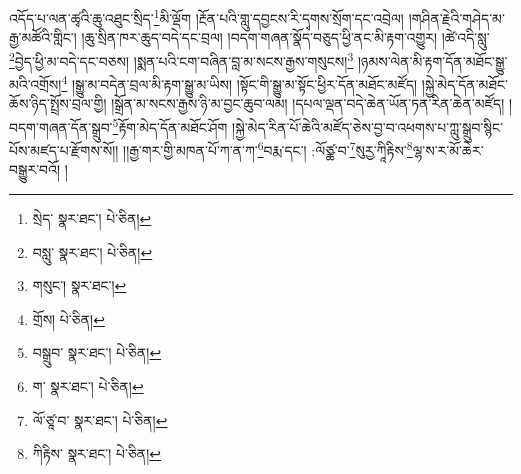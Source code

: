འདོད་པ་ལན་ཚྭའི་ཆུ་འཐུང་སྲིད་\footnote{སྲེད་  སྣར་ཐང་།  པེ་ཅིན། }མི་ལྡོག །རྔོན་པའི་གླུ་དབྱངས་རི་དྭགས་སྲོག་དང་འབྲེལ། །གཤིན་རྗེའི་གཤེད་མ་རྒྱ་མཚོའི་གླིང་། །ཆུ་སྲིན་ཁར་ཆུད་བདེ་དང་བྲལ། །བདག་གཞན་སྣོད་བཅུད་ཕྱི་ནང་མི་རྟག་འགྱུར། །ཚེ་འདི་སླུ་\footnote{བསླུ་  སྣར་ཐང་།  པེ་ཅིན། }བྱེད་ཕྱི་མ་བདེ་དང་བཅས། །སྨན་པའི་ངག་བཞིན་བླ་མ་སངས་རྒྱས་གསུངས།\footnote{གསུང་།  སྣར་ཐང་། } །ཉམས་ལེན་མི་རྟག་དོན་མཐོང་སྒྱུ་མའི་འགྲོས།\footnote{གྲོས།  པེ་ཅིན། } །སྒྱུ་མ་བདེན་བྲལ་མི་རྟག་སྒྱུ་མ་ཡིས། །སྟོང་གི་སྒྱུ་མ་སྟོང་ཕྱིར་དོན་མཐོང་མཛོད། །སྐྱེ་མེད་དོན་མཐོང་ཆོས་ཉིད་སྤྲོས་བྲལ་གྱི། །སྒྲོན་མ་སངས་རྒྱས་ཉི་མ་བྱང་ཆུབ་ལམ། །དཔལ་ལྡན་བདེ་ཆེན་ཡོན་ཏན་རིན་ཆེན་མཛོད། །བདག་གཞན་དོན་སྒྲུབ་\footnote{བསྒྲུབ་  སྣར་ཐང་།  པེ་ཅིན། }རྟོག་མེད་དོན་མཐོང་ཤོག །སྐྱེ་མེད་རིན་པོ་ཆེའི་མཛོད་ཅེས་བྱ་བ་འཕགས་པ་ཀླུ་སྒྲུབ་སྙིང་པོས་མཛད་པ་རྫོགས་སོ།། །།རྒྱ་གར་གྱི་མཁན་པོ་ཀ་ན་ཀ་\footnote{ག་  སྣར་ཐང་།  པེ་ཅིན། }བརྨ་དང་། :ལོཙྪ་བ་\footnote{ལོ་ཙཱ་བ་  སྣར་ཐང་།  པེ་ཅིན། }སུརྱ་ཀཱིརྟིས་\footnote{ཀིརྟིས་  སྣར་ཐང་།  པེ་ཅིན། }ལྷ་ས་ར་མོ་ཆེར་བསྒྱུར་བའོ། ། 